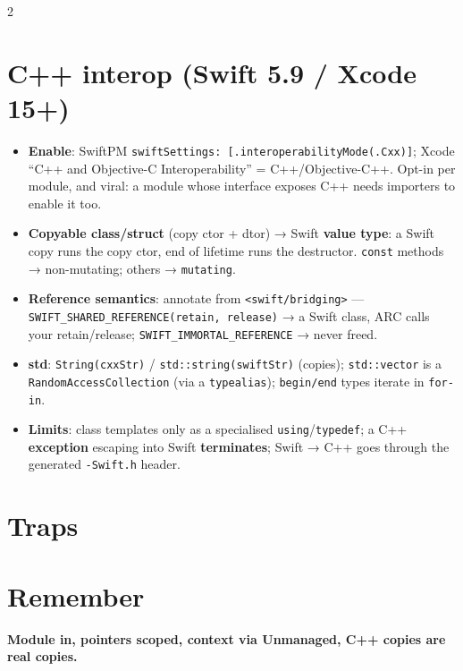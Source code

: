 \documentclass[8pt]{extarticle}
\newcommand\dc{\hbox{:}\hbox{:}}      %
\begin{document}
\begin{multicols}{2}
\section{C++ interop (Swift 5.9 / Xcode 15+)}
\begin{itemize}
  \item \textbf{Enable}: SwiftPM \texttt{swiftSettings: [.interoperabilityMode(.Cxx)]};
        Xcode ``C++ and Objective-C Interoperability'' = C++/Objective-C++. Opt-in per
        module, and viral: a module whose interface exposes C++ needs importers to
        enable it too.
  \item \textbf{Copyable class/struct} (copy ctor + dtor) → Swift \textbf{value type}:
        a Swift copy runs the copy ctor, end of lifetime runs the destructor.
        \texttt{const} methods → non-mutating; others → \texttt{mutating}.
  \item \textbf{Reference semantics}: annotate from \texttt{<swift/bridging>} —
        \texttt{SWIFT\_SHARED\_REFERENCE(retain, release)} → a Swift class, ARC calls your
        retain/release; \texttt{SWIFT\_IMMORTAL\_REFERENCE} → never freed.
  \item \textbf{std}: \texttt{String(cxxStr)} / \texttt{std\dc string(swiftStr)} (copies);
        \texttt{std\dc vector} is a \texttt{RandomAccessCollection} (via a
        \texttt{typealias}); \texttt{begin/end} types iterate in \texttt{for-in}.
  \item \textbf{Limits}: class templates only as a specialised \texttt{using}/\texttt{typedef};
        a C++ \textbf{exception} escaping into Swift \textbf{terminates}; Swift → C++
        goes through the generated \texttt{-Swift.h} header.
\end{itemize}

\section{Traps}
\begin{itemize}
\end{itemize}

\section{Remember}
\textbf{Module in, pointers scoped, context via Unmanaged, C++ copies are real copies.}


\end{multicols}

\end{document}
